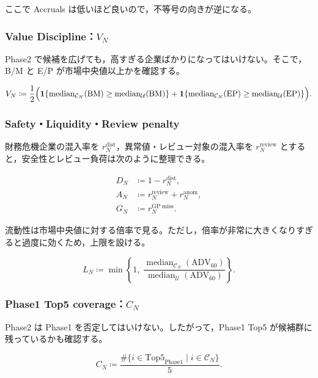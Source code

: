 \documentclass[a4paper,10pt]{article}
\newcommand{\ADV}{\mathrm{ADV}}
\newcommand{\BM}{\mathrm{BM}}
\newcommand{\EP}{\mathrm{EP}}
\newcommand{\median}{\operatorname{median}}
\newcommand{\1}{\mathbf{1}}
\begin{document}
ここで Accruals は低いほど良いので，不等号の向きが逆になる。

\subsubsection{Value Discipline：$V_N$}
Phase2 で候補を広げても，高すぎる企業ばかりになってはいけない。そこで，B/M と E/P が市場中央値以上かを確認する。

\begin{equation}
V_N \coloneqq \frac{1}{2}\Bigl(\1\{\median_{\mathcal{C}_N}(\BM)\ge \median_{\mathcal{U}}(\BM)\}+\1\{\median_{\mathcal{C}_N}(\EP)\ge \median_{\mathcal{U}}(\EP)\}\Bigr).
\label{eq:value-score}
\end{equation}

\subsubsection{Safety・Liquidity・Review penalty}
財務危機企業の混入率を $r_N^{\mathrm{dist}}$，異常値・レビュー対象の混入率を $r_N^{\mathrm{review}}$ とすると，安全性とレビュー負荷は次のように整理できる。

\begin{align}
D_N &\coloneqq 1-r_N^{\mathrm{dist}}, \label{eq:safety-score}\\
A_N &\coloneqq r_N^{\mathrm{review}}+r_N^{\mathrm{anom}}, \label{eq:review-penalty}\\
G_N &\coloneqq r_N^{\mathrm{GP\;miss}}. \label{eq:gp-missing-penalty}
\end{align}

流動性は市場中央値に対する倍率で見る。ただし，倍率が非常に大きくなりすぎると過度に効くため，上限を設ける。

\begin{equation}
L_N \coloneqq \min\left\{1,\;\frac{\median_{\mathcal{C}_N}(\ADV_{60})}{\median_{\mathcal{U}}(\ADV_{60})}\right\} .
\label{eq:liquidity-score}
\end{equation}

\subsubsection{Phase1 Top5 coverage：$C_N$}
Phase2 は Phase1 を否定してはいけない。したがって，Phase1 Top5 が候補群に残っているかも確認する。

\begin{equation}
C_N \coloneqq \frac{\#\{i\in \mathrm{Top5}_{\mathrm{Phase1}}\mid i\in\mathcal{C}_N\}}{5} .
\label{eq:phase1-coverage}
\end{equation}
\end{document}
